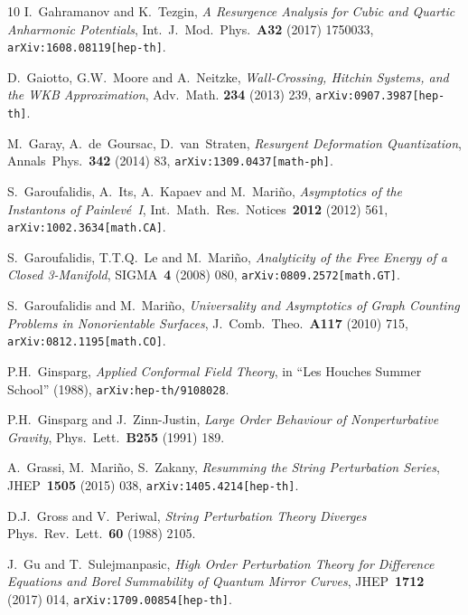 \documentclass[11pt,a4paper]{article}
\begin{document}
\begin{thebibliography}{10}
I.~Gahramanov and K.~Tezgin,
\textit{A Resurgence Analysis for Cubic and Quartic Anharmonic Potentials},
Int.\ J.\ Mod.\ Phys.\ \textbf{A32} (2017) 1750033,
\texttt{arXiv:1608.08119[hep-th]}.

D.~Gaiotto, G.W.~Moore and A.~Neitzke,
\textit{Wall-Crossing, Hitchin Systems, and the WKB Approximation},
Adv.\ Math. \textbf{234} (2013) 239,
\texttt{arXiv:0907.3987[hep-th]}.

M.~Garay, A.~de~Goursac, D.~van~Straten,
\textit{Resurgent Deformation Quantization},
Annals\ Phys.\ \textbf{342} (2014) 83,
\texttt{arXiv:1309.0437[math-ph]}.

S.~Garoufalidis, A.~Its, A.~Kapaev and M.~Mari\~no,
\textit{Asymptotics of the Instantons of Painlev\'e~I},
Int.\ Math.\ Res.\ Notices\ \textbf{2012} (2012) 561,
\texttt{arXiv:1002.3634[math.CA]}.

S.~Garoufalidis, T.T.Q.~Le and M.~Mari\~no,
\textit{Analyticity of the Free Energy of a Closed 3-Manifold},
SIGMA\ \textbf{4} (2008) 080,
\texttt{arXiv:0809.2572[math.GT]}.

S.~Garoufalidis and M.~Mari\~no,
\textit{Universality and Asymptotics of Graph Counting Problems in Nonorientable Surfaces},
J.\ Comb.\ Theo.\ \textbf{A117} (2010) 715,
\texttt{arXiv:0812.1195[math.CO]}.

P.H.~Ginsparg,
\textit{Applied Conformal Field Theory},
in ``Les Houches Summer School'' (1988),
\texttt{arXiv:hep-th/9108028}.

P.H.~Ginsparg and J.~Zinn-Justin,
\textit{Large Order Behaviour of Nonperturbative Gravity},
Phys.\ Lett.\ \textbf{B255} (1991) 189.

A.~Grassi, M.~Mari\~no, S.~Zakany,
\textit{Resumming the String Perturbation Series},
JHEP\ \textbf{1505} (2015) 038,
\texttt{arXiv:1405.4214[hep-th]}.

D.J.~Gross and V.~Periwal,
\textit{String Perturbation Theory Diverges}
Phys.\ Rev.\ Lett.\ \textbf{60} (1988) 2105.

J.~Gu and T.~Sulejmanpasic,
\textit{High Order Perturbation Theory for Difference Equations and Borel Summability of Quantum Mirror Curves},
JHEP\ \textbf{1712} (2017) 014,
\texttt{arXiv:1709.00854[hep-th]}.


\end{thebibliography}
\end{document}
